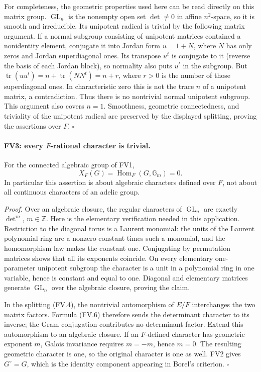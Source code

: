 For completeness, the geometric properties used here can be read
directly on this matrix group.  \(\operatorname{GL}_n\) is the nonempty
open set \(\det\ne0\) in affine \(n^2\)-space, so it is smooth and
irreducible.  Its unipotent radical is trivial by the following
matrix argument.  If a normal subgroup consisting of unipotent
matrices contained a nonidentity element, conjugate it into Jordan
form \(u=1+N\), where \(N\) has only zeros and Jordan superdiagonal
ones.  Its transpose \(u^t\) is conjugate to it (reverse the basis
of each Jordan block), so normality also puts \(u^t\) in the
subgroup.  But
\(\operatorname{tr}(uu^t)=n+\operatorname{tr}(NN^t)=n+r\),
where \(r>0\) is the number of those superdiagonal ones.  In
characteristic zero this is not the trace \(n\) of a unipotent
matrix, a contradiction.  Thus there is no nontrivial normal
unipotent subgroup.  This argument also covers \(n=1\).
Smoothness, geometric connectedness, and triviality of the unipotent
radical are preserved by the displayed splitting, proving the
assertions over \(F\). \(\square\)

\paragraph{FV3: every \(F\)-rational character is trivial.}
\label{claim:FV3}
For the connected algebraic group of FV1,
\[
                 X_F(G)=\operatorname{Hom}_F(G,\mathbb G_m)=0.
 \tag{FV.7}
\]
In particular this assertion is about algebraic characters defined
over \(F\), not about all continuous characters of an adelic group.

\emph{Proof.}
Over an algebraic closure, the regular characters of
\(\operatorname{GL}_n\) are exactly \(\det^m\), \(m\in\mathbb Z\).
Here is the elementary verification needed in this application.
Restriction to the diagonal torus is a Laurent monomial: the units
of the Laurent polynomial ring are a nonzero constant times such a
monomial, and the homomorphism law makes the constant one.
Conjugating by permutation matrices shows that all its exponents
coincide.  On every elementary one-parameter unipotent subgroup the
character is a unit in a polynomial ring in one variable, hence is
constant and equal to one.  Diagonal and elementary matrices generate
\(\operatorname{GL}_n\) over the algebraic closure, proving the claim.

In the splitting (FV.4), the nontrivial automorphism of \(E/F\)
interchanges the two matrix factors.  Formula (FV.6) therefore sends
the determinant character to its inverse; the Gram conjugation
contributes no determinant factor.  Extend this automorphism to an
algebraic closure.  If an \(F\)-defined character has geometric
exponent \(m\), Galois invariance requires \(m=-m\), hence \(m=0\).
The resulting geometric character is one, so the original character
is one as well.  FV2 gives \(G^\circ=G\), which is the identity
component appearing in Borel's criterion. \(\square\)

